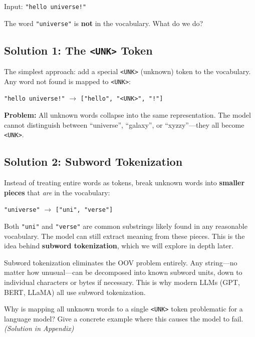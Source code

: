 \documentclass[11pt,a4paper]{article}
\begin{document}
Input: \texttt{"hello universe!"}

The word \texttt{"universe"} is \textbf{not} in the vocabulary. What do we do?

\subsection{Solution 1: The \texttt{<UNK>} Token}

The simplest approach: add a special \texttt{<UNK>} (unknown) token to the vocabulary. Any word not found is mapped to \texttt{<UNK>}:

\begin{center}
\texttt{"hello universe!"} $\to$ \texttt{["hello", "<UNK>", "!"]}
\end{center}

\textbf{Problem:} All unknown words collapse into the same representation. The model cannot distinguish between ``universe'', ``galaxy'', or ``xyzzy''---they all become \texttt{<UNK>}.

\subsection{Solution 2: Subword Tokenization}

Instead of treating entire words as tokens, break unknown words into \textbf{smaller pieces} that \emph{are} in the vocabulary:

\begin{center}
\texttt{"universe"} $\to$ \texttt{["uni", "verse"]}
\end{center}

Both \texttt{"uni"} and \texttt{"verse"} are common substrings likely found in any reasonable vocabulary. The model can still extract meaning from these pieces. This is the idea behind \textbf{subword tokenization}, which we will explore in depth later.

\begin{tcolorbox}[intuitionbox={Key Insight}]
Subword tokenization eliminates the OOV problem entirely. Any string---no matter how unusual---can be decomposed into known subword units, down to individual characters or bytes if necessary. This is why modern LLMs (GPT, BERT, LLaMA) all use subword tokenization.
\end{tcolorbox}

\begin{tcolorbox}[questionbox={Self-Check Q1}]
Why is mapping all unknown words to a single \texttt{<UNK>} token problematic for a language model? Give a concrete example where this causes the model to fail. \textit{(Solution in Appendix)}
\end{tcolorbox}
\end{document}
